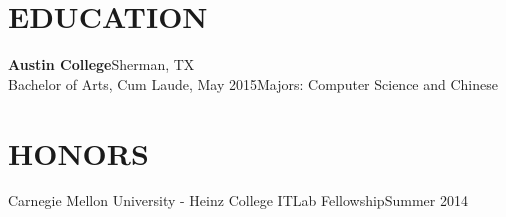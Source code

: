 \documentclass[margin]{res}
\begin{document}
\begin{resume}

\section{EDUCATION}
\textbf{Austin College}\hfill Sherman, TX\\
Bachelor of Arts, Cum Laude, May 2015\hfill Majors: Computer Science and Chinese\\

\section{HONORS}
Carnegie Mellon University - Heinz College ITLab Fellowship\hfill Summer 2014\\

\end{resume}
\end{document}

